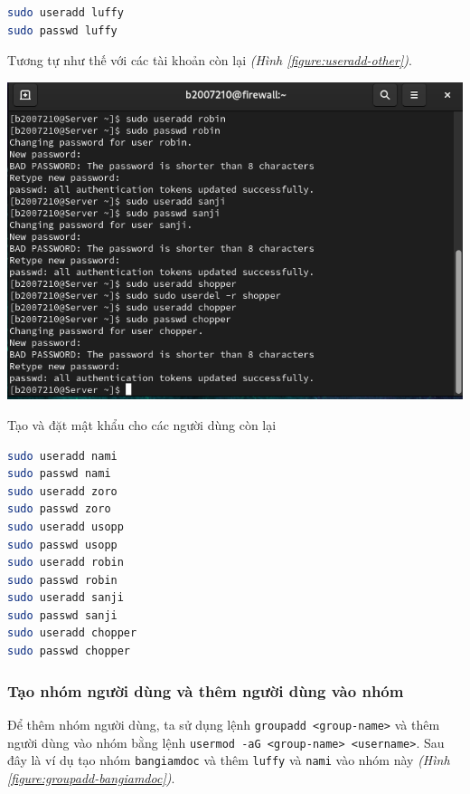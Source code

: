 \documentclass[a4paper, 11pt]{article}
\begin{document}
\begin{lstlisting}[language=bash, caption=Tạo và đặt mật khẩu cho tài khoản luffy]
sudo useradd luffy
sudo passwd luffy
\end{lstlisting}

Tương tự như thế với các tài khoản còn lại \textit{(Hình \ref{figure:useradd-other})}.

\begin{minipage}
    {\linewidth}
    \captionsetup{type=figure}
    \centering
    \includegraphics[width=\linewidth]{images/useradd-other.png}
    \caption{Tạo và đặt mật khẩu cho các người dùng còn lại}
    \label{figure:useradd-other}
\end{minipage}

\begin{lstlisting}[language=bash, caption=Tạo và đặt mật khẩu cho các người dùng còn lại]
sudo useradd nami
sudo passwd nami
sudo useradd zoro
sudo passwd zoro
sudo useradd usopp
sudo passwd usopp
sudo useradd robin
sudo passwd robin
sudo useradd sanji
sudo passwd sanji
sudo useradd chopper
sudo passwd chopper
\end{lstlisting}

\subsubsection{Tạo nhóm người dùng và thêm người dùng vào nhóm}

Để thêm nhóm người dùng, ta sử dụng lệnh \texttt{groupadd <group-name>} và thêm người dùng vào nhóm bằng lệnh \texttt{usermod -aG <group-name> <username>}.
Sau đây là ví dụ tạo nhóm \texttt{bangiamdoc} và thêm \texttt{luffy} và \texttt{nami} vào nhóm này \textit{(Hình \ref{figure:groupadd-bangiamdoc})}.
\end{document}
